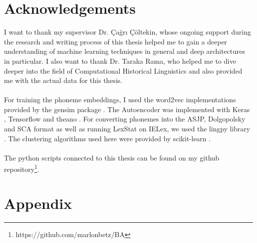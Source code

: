 \documentclass[6pt]{article}
\begin{document}
\section{Acknowledgements}
I want to thank my supervisor Dr. Çağrı Çöltekin, whose ongoing support during the research and writing process of this thesis helped me to gain a deeper understanding of machine learning techniques in general and deep architectures in particular.
I also want to thank Dr. Taraka Rama, who helped me to dive deeper into the field of Computational Historical Linguistics and also provided me with the actual data for this thesis. \\\\
For training the phoneme embeddings, I used the word2vec implementations provided by the gensim package \citep{rehurek_lrec}. The Autoencoder was implemented with Keras \citep{chollet2015keras}, Tensorflow \citep{tensorflow2015-whitepaper} and theano \citep{2016arXiv160502688short}. For converting phonemes into the ASJP, Dolgopolsky and SCA format as well as running LexStat on IELex, we used the lingpy library \citep{List2016e}. The clustering algorithms used here were provided by scikit-learn \citep{scikit-learn}. \\\\
The python scripts connected to this thesis can be found on my github repository\footnote{https://github.com/marlonbetz/BA}.


\appendix
\section{Appendix} \label{App:Appendix}
\end{document}
